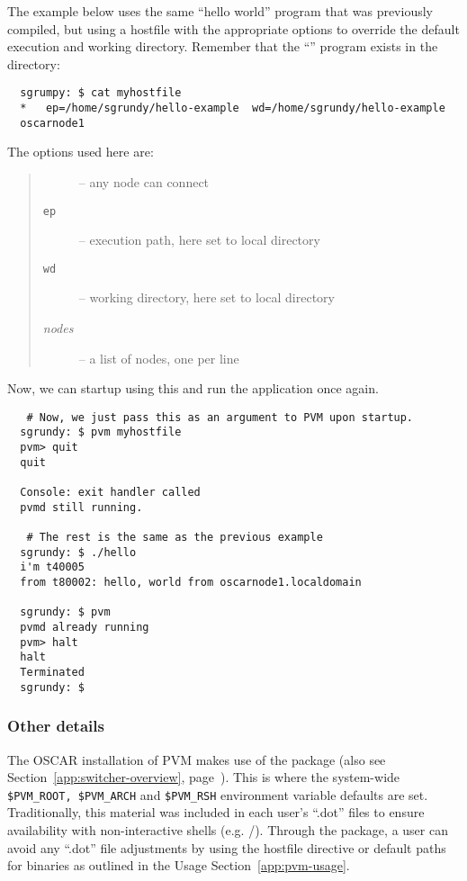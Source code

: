 The example below uses the same ``hello world'' program that was
previously compiled, but using a hostfile with the appropriate options
to override the default execution and working directory.  Remember
that the ``'' program exists in the
 directory:

\begin{small}
\begin{verbatim}
  sgrumpy: $ cat myhostfile
  *   ep=/home/sgrundy/hello-example  wd=/home/sgrundy/hello-example
  oscarnode1
\end{verbatim}
\end{small}

\noindent The options used here are: 
\begin{quote}
  \begin{description}
  \item[{\tt *}] -- any node can connect
  \item[{\tt ep}] -- execution path, here set to local directory
  \item[{\tt wd}] -- working directory, here set to local directory
  \item[\emph{nodes}] -- a list of nodes, one per line
  \end{description}
\end{quote}

\noindent Now, we can startup  using this 
and run the  application once again.

\begin{small}
\begin{verbatim}
   # Now, we just pass this as an argument to PVM upon startup.
  sgrundy: $ pvm myhostfile
  pvm> quit
  quit
  
  Console: exit handler called
  pvmd still running.

   # The rest is the same as the previous example
  sgrundy: $ ./hello
  i'm t40005
  from t80002: hello, world from oscarnode1.localdomain

  sgrundy: $ pvm
  pvmd already running
  pvm> halt
  halt
  Terminated
  sgrundy: $
\end{verbatim}
\end{small}

\subsubsection{Other details}

The OSCAR installation of PVM makes use of the 
package (also see Section~\ref{app:switcher-overview},
page~\pageref{app:switcher-overview}).  This is where the system-wide
\verb=$PVM_ROOT, $PVM_ARCH= and \verb=$PVM_RSH= environment variable
defaults are set.  Traditionally, this material was included in each
user's ``.dot'' files to ensure availability with non-interactive
shells (e.g. /).  Through the 
package, a user can avoid any ``.dot'' file adjustments by using the
hostfile directive or default paths for binaries as outlined in the
Usage Section~\ref{app:pvm-usage}.

